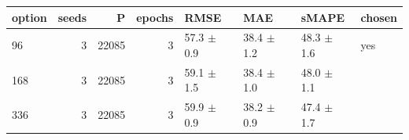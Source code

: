 \begin{tabular}{lrrrllll}
\toprule
option & seeds & P & epochs & RMSE & MAE & sMAPE & chosen \\
\midrule
96 & 3 & 22085 & 3 & 57.3 $\pm$ 0.9 & 38.4 $\pm$ 1.2 & 48.3 $\pm$ 1.6 & yes \\
168 & 3 & 22085 & 3 & 59.1 $\pm$ 1.5 & 38.4 $\pm$ 1.0 & 48.0 $\pm$ 1.1 &  \\
336 & 3 & 22085 & 3 & 59.9 $\pm$ 0.9 & 38.2 $\pm$ 0.9 & 47.4 $\pm$ 1.7 &  \\
\bottomrule
\end{tabular}
